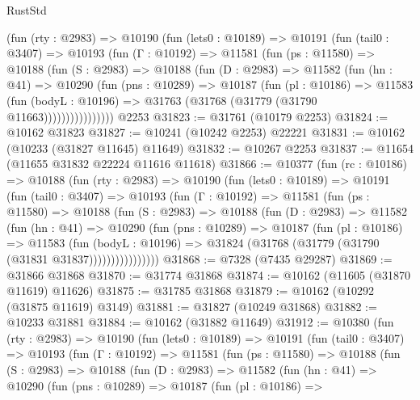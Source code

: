 \begin{lexlean}{RustStd}
\begin{coremodule}
        (fun (rty : @2983) =>
        @10190
          (fun (lets0 : @10189) =>
          @10191
            (fun (tail0 : @3407) =>
            @10193
              (fun (Γ : @10192) =>
              @11581
                (fun (ps : @11580) =>
                @10188
                  (fun (S : @2983) =>
                  @10188
                    (fun (D : @2983) =>
                    @11582
                      (fun (hn : @41) =>
                      @10290
                        (fun (pns : @10289) =>
                        @10187
                          (fun (pl : @10186) =>
                          @11583
                            (fun (bodyL : @10196) =>
                            @31763 (@31768 (@31779 (@31790 @11663))))))))))))))))
    @2253
@31823 := @31761 (@10179 @2253)
@31824 := @10162 @31823
@31827 := @10241 (@10242 @2253) @22221
@31831 := @10162 (@10233 (@31827 @11645) @11649)
@31832 := @10267 @2253
@31837 := @11654 (@11655 @31832 @22224 @11616 @11618)
@31866 := @10377
    (fun (rc : @10186) =>
    @10188
      (fun (rty : @2983) =>
      @10190
        (fun (lets0 : @10189) =>
        @10191
          (fun (tail0 : @3407) =>
          @10193
            (fun (Γ : @10192) =>
            @11581
              (fun (ps : @11580) =>
              @10188
                (fun (S : @2983) =>
                @10188
                  (fun (D : @2983) =>
                  @11582
                    (fun (hn : @41) =>
                    @10290
                      (fun (pns : @10289) =>
                      @10187
                        (fun (pl : @10186) =>
                        @11583
                          (fun (bodyL : @10196) =>
                          @31824 (@31768 (@31779 (@31790 (@31831 @31837))))))))))))))))
@31868 := @7328 (@7435 @29287)
@31869 := @31866 @31868
@31870 := @31774 @31868
@31874 := @10162 (@11605 (@31870 @11619) @11626)
@31875 := @31785 @31868
@31879 := @10162 (@10292 (@31875 @11619) @3149)
@31881 := @31827 (@10249 @31868)
@31882 := @10233 @31881
@31884 := @10162 (@31882 @11649)
@31912 := @10380
    (fun (rty : @2983) =>
    @10190
      (fun (lets0 : @10189) =>
      @10191
        (fun (tail0 : @3407) =>
        @10193
          (fun (Γ : @10192) =>
          @11581
            (fun (ps : @11580) =>
            @10188
              (fun (S : @2983) =>
              @10188
                (fun (D : @2983) =>
                @11582
                  (fun (hn : @41) =>
                  @10290
                    (fun (pns : @10289) =>
                    @10187
                      (fun (pl : @10186) =>

\end{coremodule}
\end{lexlean}
